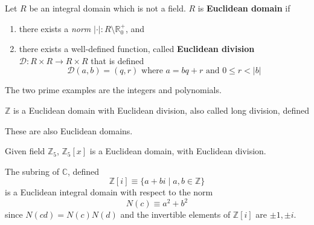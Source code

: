   \begin{definition}
    Let $R$ be an integral domain which is not a field. $R$ is \textbf{Euclidean domain} if 
    \begin{enumerate}
      \item there exists a \textit{norm} $|\cdot|: R \setminus \mathbb{R}_0^+$, and  
      \item there exists a well-defined function, called \textbf{Euclidean division} $\mathcal{D}: R \times R \rightarrow R \times R$ that is defined 
      \begin{equation}
        \mathcal{D}(a, b) = (q, r) \text{ where } a = bq + r \text{ and } 0 \leq r < |b|
      \end{equation}
    \end{enumerate}
  \end{definition}

  The two prime examples are the integers and polynomials. 

  \begin{example}[Integers]
    $\mathbb{Z}$ is a Euclidean domain with Euclidean division, also called long division, defined 

    \begin{center}
    \end{center}
  \end{example}

  \begin{example}
    These are also Euclidean domains. 
    
    \begin{center}
    \end{center}

    Given field $\mathbb{Z}_5$, $\mathbb{Z}_5[x]$ is a Euclidean domain, with Euclidean division.  
  \end{example}

  \begin{example}
    The subring of $\mathbb{C}$, defined
    \begin{equation}
      \mathbb{Z}[i] \equiv \{ a + b i \; | \; a, b \in \mathbb{Z} \}
    \end{equation}
    is a Euclidean integral domain with respect to the norm 
    \begin{equation}
      N(c) \equiv a^2 + b^2
    \end{equation}
    since $N(c d) = N(c) N(d)$ and the invertible elements of $\mathbb{Z}[i]$ are $\pm 1, \pm i$. 
  \end{example}

